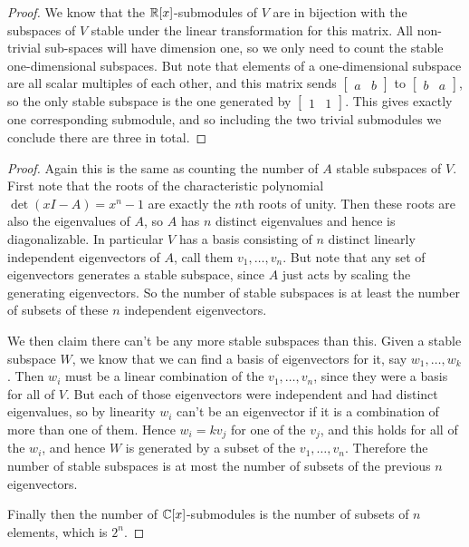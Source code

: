 \documentclass[11pt]{article}
\begin{document}
\begin{proof}
  We know that the $\mathbb{R}[x]$-submodules of $V$ are in bijection with the subspaces of $V$ stable under the linear transformation for this matrix.
  All non-trivial sub-spaces will have dimension one, so we only need to count the stable one-dimensional subspaces.
  But note that elements of a one-dimensional subspace are all scalar multiples of each other,
  and this matrix sends $\begin{bmatrix}a & b\end{bmatrix}$ to $\begin{bmatrix}b & a\end{bmatrix}$,
  so the only stable subspace is the one generated by $\begin{bmatrix}1 & 1\end{bmatrix}$.
  This gives exactly one corresponding submodule, and so including the two trivial submodules we conclude there are three in total.
\end{proof}

\begin{proof}
  Again this is the same as counting the number of $A$ stable subspaces of $V$.
  First note that the roots of the characteristic polynomial $\det(xI - A) = x^n - 1$ are exactly the $n$th roots of unity.
  Then these roots are also the eigenvalues of $A$, so $A$ has $n$ distinct eigenvalues and hence is diagonalizable.
  In particular $V$ has a basis consisting of $n$ distinct linearly independent eigenvectors of $A$, call them $v_1,\dots,v_n$.
  But note that any set of eigenvectors generates a stable subspace, since $A$ just acts by scaling the generating eigenvectors.
  So the number of stable subspaces is at least the number of subsets of these $n$ independent eigenvectors.
  
  We then claim there can't be any more stable subspaces than this.
  Given a stable subspace $W$, we know that we can find a basis of eigenvectors for it, say $w_1,\dots,w_k$.
  Then $w_i$ must be a linear combination of the $v_1,\dots,v_n$, since they were a basis for all of $V$.
  But each of those eigenvectors were independent and had distinct eigenvalues, so by linearity $w_i$ can't be an eigenvector if it is a combination of more than one of them.
  Hence $w_i = kv_j$ for one of the $v_j$, and this holds for all of the $w_i$, and hence $W$ is generated by a subset of the $v_1,\dots,v_n$.
  Therefore the number of stable subspaces is at most the number of subsets of the previous $n$ eigenvectors.
  
  Finally then the number of $\mathbb{C}[x]$-submodules is the number of subsets of $n$ elements, which is $2^n$.
\end{proof}
\end{document}
